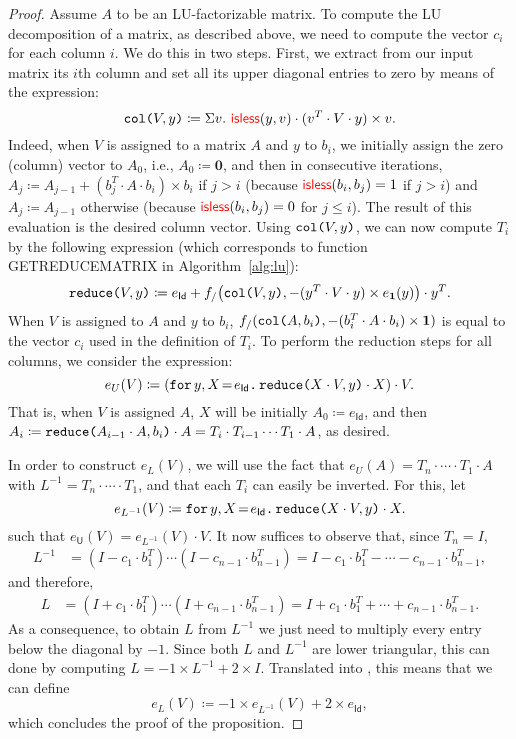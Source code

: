 \begin{proof}
Assume $A$ to be an LU-factorizable matrix. To compute the LU decomposition of a matrix, as described above, we need to compute the vector $c_i$ for each column $i$. We do this in two steps. First, we extract from our input matrix its $i$th column and set all its upper diagonal entries to zero
by means of 
 the 
 expression:
$$\ccol{V}{y} \coloneqq   \Sigma v. \  \EDIT{\isless}(y,v)\cdot(v^T\cdot V \cdot y)\times v.$$
Indeed, when $V$ is assigned to a matrix $A$ and $y$ to $b_i$, we initially assign the zero (column) vector to $A_0$, i.e., 
$A_0\coloneqq  \mathbf{0}$, and then in consecutive iterations,  $A_j\coloneqq  A_{j-1}+ (b_j^T\cdot A\cdot b_i)\times b_i$ if $j>i$ (because $\EDIT{\isless}(b_i,b_j)=1$ if $j>i$) and $A_j\coloneqq A_{j-1}$ otherwise (because $\EDIT{\isless}(b_i,b_j)=0$ for $j\leq i$). The result of this evaluation is the desired column vector.
Using $\ccol{V}{y}$, we can now compute $T_i$ by the following expression (which corresponds to function GETREDUCEMATRIX in Algorithm~\ref{alg:lu}):
$$\red{V}{y} \coloneqq   e_{\mathsf{Id}}+ f_/\bigl(\ccol{V}{y},-(y^T\cdot V\cdot y)\times e_{\ones}(y)\bigr)\cdot y^T.$$
When $V$ is assigned to $A$ and $y$ to $b_i$, $f_/(\ccol{A}{b_i},-(b_i^T\cdot A\cdot b_i)\times \ones)$ is equal to the vector $c_i$ used in the definition of $T_i$. To perform the reduction steps for all columns, we consider
the expression:
$$
e_{U}(V) \coloneqq    \left( \initf{e_{\mathsf{Id}}}{y}{X}{\red{X\cdot V}{y}\cdot X} \right) \cdot V.
$$
That is, when $V$ is assigned $A$, $X$ will be initially $A_0\coloneqq  e_{\mathsf{Id}}$, and then
$A_i\coloneqq  \red{A_{i-1}\cdot A}{b_i}\cdot A=T_i\cdot T_{i-1}\cdots T_1\cdot A$, as desired.

In order to construct $e_L(V)$, we will use the fact that $e_U(A)=T_n\cdot\cdots\cdot T_1\cdot A$ with $L^{-1}=T_n\cdot\cdots\cdot T_1$, and that each $T_i$ can easily be inverted. For this, let
    $$
    e_{L^{-1}}(V) \coloneqq    \initf{e_{\mathsf{Id}}}{y}{X}{\red{X\cdot V}{y}\cdot X}.
    $$
    such that	$e_{\mathsf{U}}(V)=  e_{L^{-1}}(V) \cdot V$. It now suffices to observe that, since $T_n=I$,
    \begin{align*}
    L^{-1}&=(I-c_1\cdot b_1^T)\cdots (I-c_{n-1}\cdot  b_{n-1}^T)
    =I-c_1\cdot b_1^T-\cdots - c_{n-1}\cdot b_{n-1}^T,
    \end{align*}
and therefore,    
    \begin{align*}
    L&=(I+c_1\cdot b_1^T)\cdots (I+c_{n-1}\cdot b_{n-1}^T) =I+c_1\cdot b_1^T+\cdots + c_{n-1}\cdot b_{n-1}^T.
    \end{align*}
    As a consequence, to obtain $L$ from $L^{-1}$ we just need to multiply every entry below the diagonal by $-1$. Since both  $L$ and $L^{-1}$ are lower triangular, this can done 
    by computing $L=-1\times L^{-1} + 2\times I$. Translated into \langfor, this means that we can define
    $$
    e_{L}(V) \coloneqq    -1\times e_{L^{-1}}(V) + 2\times e_{\mathsf{Id}},
    $$
    which concludes the proof of the proposition.    
\end{proof}

